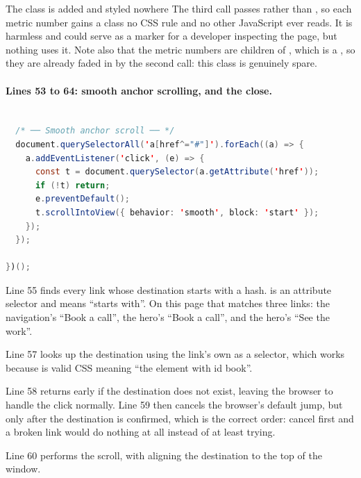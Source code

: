 \begin{honest}{The class  is added and styled nowhere}
The third call passes  rather than , so each metric
number gains a class no CSS rule and no other JavaScript ever reads. It is harmless
and could serve as a marker for a developer inspecting the page, but nothing uses
it. Note also that the metric numbers are children of , which is
a , so they are already faded in by the second call: this class is
genuinely spare.
\end{honest}

\paragraph{Lines 53 to 64: smooth anchor scrolling, and the close.}

\begin{lstlisting}[language=Java,firstnumber=53,caption={\file{js/main.js}, lines 53--64}]

  /* ── Smooth anchor scroll ── */
  document.querySelectorAll('a[href^="#"]').forEach((a) => {
    a.addEventListener('click', (e) => {
      const t = document.querySelector(a.getAttribute('href'));
      if (!t) return;
      e.preventDefault();
      t.scrollIntoView({ behavior: 'smooth', block: 'start' });
    });
  });

})();
\end{lstlisting}

Line 55 finds every link whose destination starts with a hash.
 is an attribute selector and \code{\^{}=} means ``starts
with''. On this page that matches three links: the navigation's ``Book a call'', the
hero's ``Book a call'', and the hero's ``See the work''.

Line 57 looks up the destination using the link's own  as a selector,
which works because  is valid CSS meaning ``the element with id book''.

Line 58 returns early if the destination does not exist, leaving the browser to
handle the click normally. Line 59 then cancels the browser's default jump, but only
after the destination is confirmed, which is the correct order: cancel first and a
broken link would do nothing at all instead of at least trying.

Line 60 performs the scroll, with  aligning the destination to
the top of the window.

